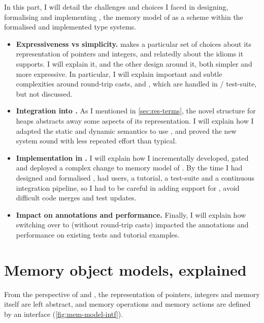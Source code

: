 In this part, I will detail the challenges and choices I faced in designing,
formalising and implementing , the memory model of  as a scheme
within the formalised and implemented type systems.
\begin{itemize}
    \item \textbf{Expressiveness vs simplicity.}  makes a particular
        set of choices about its representation of pointers and integers, and relatedly
        about the idioms it supports. I will explain it, and the other
        design around it, both simpler and more expressive. In particular,
        I will explain important and subtle complexities around round-trip casts,
         and , which are handled in
        / test-suite, but not discussed.
    \item \textbf{Integration into .} As I mentioned in
        \cref{sec:res-terms}, the novel structure for heaps abstracts away
        some aspects of its representation. I will explain how I adapted the
        static and dynamic semantics to use , and proved the new system
        sound with less repeated effort than typical.
    \item \textbf{Implementation in .} I will explain how I incrementally
        developed, gated and deployed a complex change to memory model of .
        By the time I had designed and formalised ,  had
        users, a tutorial, a test-suite and a continuous integration pipeline,
        so I had to be careful in adding support for , avoid difficult
        code merges and test updates.
    \item \textbf{Impact on annotations and performance.} Finally, I will explain
        how switching over to  (without round-trip casts) impacted
        the annotations and performance on existing  tests and tutorial
        examples.
\end{itemize}

\chapter{Memory object models, explained}\label{chap:mem-model-explained}

\margintoc%

From the perspective of  and , the representation of
pointers, integers and memory itself are left abstract, and memory operations
and memory actions are defined by an interface (\cref{fig:mem-model-intf}).

